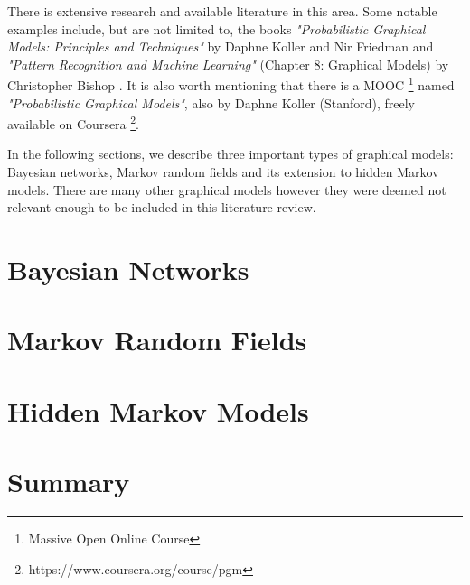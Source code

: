 There is extensive research and available literature in this area. Some notable examples include, but are not limited to, the books \textit{"Probabilistic Graphical Models: Principles and Techniques"} by Daphne Koller and Nir Friedman \cite{koller2009probabilistic} and \textit{"Pattern Recognition and Machine Learning"} (Chapter 8: Graphical Models) by Christopher Bishop \cite{bishop2006pattern}. It is also worth mentioning that there is a MOOC \footnote{Massive Open Online Course} named \textit{"Probabilistic Graphical Models"}, also by Daphne Koller (Stanford), freely available on Coursera \footnote{https://www.coursera.org/course/pgm}.

In the following sections, we describe three important types of graphical models: Bayesian networks, Markov random fields and its extension to hidden Markov models. There are many other graphical models however they were deemed not relevant enough to be included in this literature review.

\section{Bayesian Networks}

\section{Markov Random Fields}

\section{Hidden Markov Models}

\cite{Rabiner1989}

\section{Summary}

